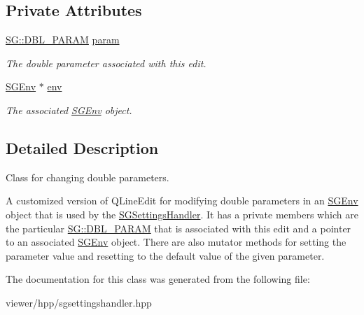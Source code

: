 \subsection*{Private Attributes}
\begin{DoxyCompactItemize}
\item 
\mbox{\label{classSGDblParamEdit_af4a14244a9b1a3f4e74da882b02f83f0}} 
\hyperlink{namespaceSG_ac2f86c953fcec4419ac86538d9d314b6}{S\+G\+::\+D\+B\+L\+\_\+\+P\+A\+R\+AM} \hyperlink{classSGDblParamEdit_af4a14244a9b1a3f4e74da882b02f83f0}{param}
\begin{DoxyCompactList}\small\item\em The double parameter associated with this edit. \end{DoxyCompactList}\item 
\mbox{\label{classSGDblParamEdit_a4c9f7466833f32a1f8f3f4fc25def48c}} 
\hyperlink{classSGEnv}{S\+G\+Env} $\ast$ \hyperlink{classSGDblParamEdit_a4c9f7466833f32a1f8f3f4fc25def48c}{env}
\begin{DoxyCompactList}\small\item\em The associated \hyperlink{classSGEnv}{S\+G\+Env} object. \end{DoxyCompactList}\end{DoxyCompactItemize}


\subsection{Detailed Description}
Class for changing double parameters. 

A customized version of Q\+Line\+Edit for modifying double parameters in an \hyperlink{classSGEnv}{S\+G\+Env} object that is used by the \hyperlink{classSGSettingsHandler}{S\+G\+Settings\+Handler}. It has a private members which are the particular \hyperlink{namespaceSG_ac2f86c953fcec4419ac86538d9d314b6}{S\+G\+::\+D\+B\+L\+\_\+\+P\+A\+R\+AM} that is associated with this edit and a pointer to an associated \hyperlink{classSGEnv}{S\+G\+Env} object. There are also mutator methods for setting the parameter value and resetting to the default value of the given parameter. 

The documentation for this class was generated from the following file\+:\begin{DoxyCompactItemize}
\item 
viewer/hpp/sgsettingshandler.\+hpp\end{DoxyCompactItemize}
